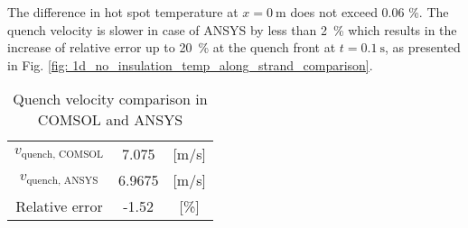 The difference in hot spot temperature at $x=0~\text{m}$ does not exceed 0.06 \%. The quench velocity is slower in case of ANSYS by less than 2~\% which results in the increase of relative error up to 20~\% at the quench front at $t=0.1~\text{s}$, as presented in Fig. \ref{fig: 1d_no_insulation_temp_along_strand_comparison}.

\begin{table}[h!]
    \caption{Quench velocity comparison in COMSOL and ANSYS} 
    \vspace{-1.em} 
    \fontsize{10}{10}
    \selectfont 
    \renewcommand{\arraystretch}{1.5}
    \begin{center}
        \begin{tabular}{ ccc }  
        \hline
        $v_\text{quench, COMSOL}$ & 7.075 & [m/s] \\
        $v_\text{quench, ANSYS}$ & 6.9675 & [m/s] \\
        Relative error & -1.52 & [\%] \\
        \hline 
        \end{tabular}
    \end{center}  
     \label{table: 1d_no_insulation_v_quench_comparison} 
 \end{table}

